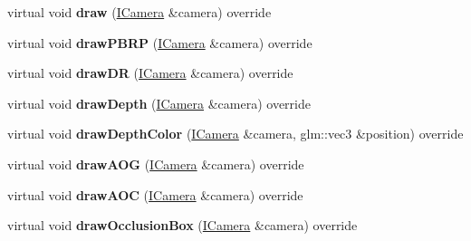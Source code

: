 \begin{DoxyCompactItemize}
\item 
\mbox{\label{classflw_1_1flf_1_1Entity_aee49157914b8dc708b4c42bd4ad07073}} 
virtual void {\bfseries draw} (\hyperlink{classflw_1_1flf_1_1ICamera}{I\+Camera} \&camera) override
\item 
\mbox{\label{classflw_1_1flf_1_1Entity_a9f77adfda64f405f9975299f4ff75c52}} 
virtual void {\bfseries draw\+P\+B\+RP} (\hyperlink{classflw_1_1flf_1_1ICamera}{I\+Camera} \&camera) override
\item 
\mbox{\label{classflw_1_1flf_1_1Entity_a83776205205468756486576ee677a31f}} 
virtual void {\bfseries draw\+DR} (\hyperlink{classflw_1_1flf_1_1ICamera}{I\+Camera} \&camera) override
\item 
\mbox{\label{classflw_1_1flf_1_1Entity_a62a7675c097053e9906caec2d11d9cb3}} 
virtual void {\bfseries draw\+Depth} (\hyperlink{classflw_1_1flf_1_1ICamera}{I\+Camera} \&camera) override
\item 
\mbox{\label{classflw_1_1flf_1_1Entity_afe8c6cefefc76104ab9b0a5ed80c7443}} 
virtual void {\bfseries draw\+Depth\+Color} (\hyperlink{classflw_1_1flf_1_1ICamera}{I\+Camera} \&camera, glm\+::vec3 \&position) override
\item 
\mbox{\label{classflw_1_1flf_1_1Entity_aa32e27988fd0434f9b6a2dff1f90335c}} 
virtual void {\bfseries draw\+A\+OG} (\hyperlink{classflw_1_1flf_1_1ICamera}{I\+Camera} \&camera) override
\item 
\mbox{\label{classflw_1_1flf_1_1Entity_a147efc00f87398f5fee13206fdc1c161}} 
virtual void {\bfseries draw\+A\+OC} (\hyperlink{classflw_1_1flf_1_1ICamera}{I\+Camera} \&camera) override
\item 
\mbox{\label{classflw_1_1flf_1_1Entity_a873a0fa0930c5ac7e1b99011f024a87b}} 
virtual void {\bfseries draw\+Occlusion\+Box} (\hyperlink{classflw_1_1flf_1_1ICamera}{I\+Camera} \&camera) override
\item 
\mbox{\label{classflw_1_1flf_1_1Entity_a58d2d7a158a3f51a507e2c3346c22e91}} 

\end{DoxyCompactItemize}
